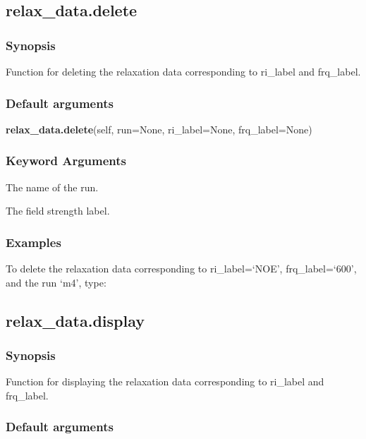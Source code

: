 \subsection{relax\_data.delete}


\subsubsection{Synopsis}

Function for deleting the relaxation data corresponding to ri\_label and frq\_label.

\subsubsection{Default arguments}

\textsf{\textbf{relax\_data.delete}(self, run=None, ri\_label=None, frq\_label=None)}


\subsubsection{Keyword Arguments}

  The name of the run.

  The field strength label.

\subsubsection{Examples}

To delete the relaxation data corresponding to ri\_label=`NOE', frq\_label=`600', and the run
`m4', type:




\newpage

\subsection{relax\_data.display}


\subsubsection{Synopsis}

Function for displaying the relaxation data corresponding to ri\_label and frq\_label.

\subsubsection{Default arguments}

